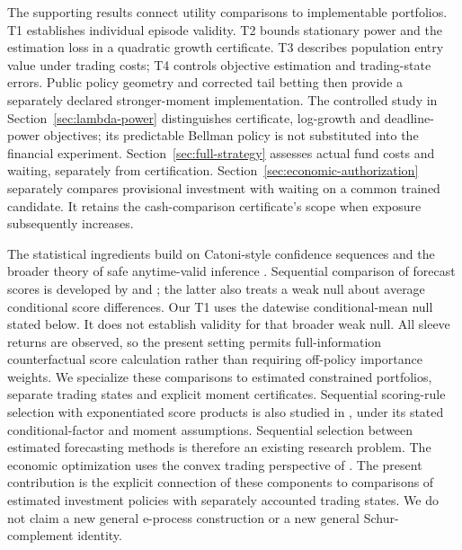 \documentclass[11pt,a4paper]{article}
\theoremstyle{remark}\newtheorem{remark}[theorem]{Remark}
\begin{document}
The supporting results connect utility comparisons to implementable
portfolios. T1 establishes individual episode validity. T2 bounds stationary
power and the estimation loss in a quadratic growth certificate. T3 describes
population entry value under trading costs; T4 controls objective estimation
and trading-state errors. Public policy geometry and corrected tail betting
then provide a separately declared stronger-moment implementation. The
controlled study in Section~\ref{sec:lambda-power} distinguishes certificate,
log-growth and deadline-power objectives; its predictable Bellman policy is
not substituted into the financial experiment. Section~\ref{sec:full-strategy}
assesses actual fund costs and waiting, separately from certification.
Section~\ref{sec:economic-authorization} separately compares provisional
investment with waiting on a common trained candidate. It retains the
cash-comparison certificate's scope when exposure subsequently increases.

The statistical ingredients build on Catoni-style confidence sequences
\cite{wr} and the broader theory of safe anytime-valid inference \cite{savi}.
Sequential comparison of forecast scores is developed by \cite{henzi} and
\cite{choe}; the latter also treats a weak null about average conditional
score differences. Our T1 uses the datewise conditional-mean null stated
below. It does not establish validity for that broader weak null. All sleeve
returns are observed, so the present setting permits full-information
counterfactual score calculation rather than requiring off-policy importance
weights. We specialize these comparisons to estimated constrained portfolios,
separate trading states and explicit moment certificates.
Sequential scoring-rule selection with exponentiated score products is also
studied in \cite{ssre}, under its stated conditional-factor and moment
assumptions. Sequential selection between estimated forecasting methods is
therefore an existing research problem.
The economic optimization uses the convex trading perspective of
\cite{boyd}. The present contribution is the explicit connection of these
components to comparisons of estimated investment policies with separately
accounted trading states. We do not claim a new general e-process construction
or a new general Schur-complement identity.
\end{document}
